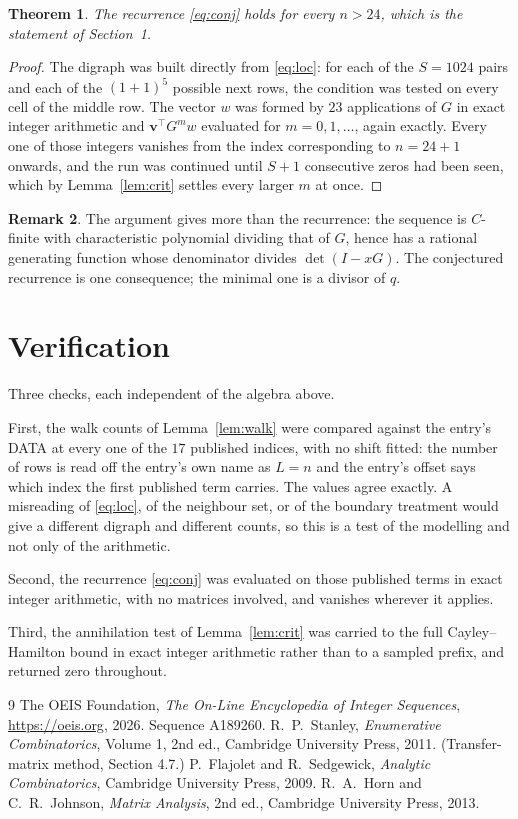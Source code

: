 \documentclass[11pt,a4paper]{article}
\theoremstyle{plain}
\newtheorem{theorem}{Theorem}
\theoremstyle{definition}
\newtheorem{remark}[theorem]{Remark}
\begin{document}
\begin{theorem}
The recurrence \eqref{eq:conj} holds for every $n>24$, which is the statement of
Section~1.
\end{theorem}

\begin{proof}
The digraph was built directly from \eqref{eq:loc}: for each of the $S=1024$ pairs and each
of the $(1+1)^{5}$ possible next rows, the condition was tested on every cell of
the middle row. The vector $w$ was formed by $23$ applications of $G$ in exact integer
arithmetic and $\mathbf{v}^{\!\top}G^{m}w$ evaluated for $m=0,1,\dots$, again exactly.
Every one of those integers vanishes from the index corresponding to $n=24+1$ onwards,
and the run was continued until $S+1$ consecutive zeros had been seen, which by
Lemma~\ref{lem:crit} settles every larger $m$ at once.
\end{proof}

\begin{remark}
The argument gives more than the recurrence: the sequence is $C$-finite with characteristic
polynomial dividing that of $G$, hence has a rational generating function whose denominator
divides $\det(I-xG)$. The conjectured recurrence is one consequence; the minimal one is a
divisor of $q$.
\end{remark}

\section{Verification}

Three checks, each independent of the algebra above.

First, the walk counts of Lemma~\ref{lem:walk} were compared against the entry's DATA at
every one of the $17$ published indices, with no shift fitted: the number of rows is
read off the entry's own name as $L=n$ and the entry's offset says which index the first
published term carries. The values agree exactly. A misreading of \eqref{eq:loc}, of the
neighbour set, or of the boundary treatment would give a different digraph and different
counts, so this is a test of the modelling and not only of the arithmetic.

Second, the recurrence \eqref{eq:conj} was evaluated on those published terms in exact
integer arithmetic, with no matrices involved, and vanishes wherever it applies.

Third, the annihilation test of Lemma~\ref{lem:crit} was carried to the full
Cayley--Hamilton bound in exact integer arithmetic rather than to a sampled prefix, and
returned zero throughout.

\begin{thebibliography}{9}
 The OEIS Foundation, \emph{The On-Line Encyclopedia of Integer
Sequences}, \url{https://oeis.org}, 2026. Sequence A189260.
 R.~P.~Stanley, \emph{Enumerative Combinatorics}, Volume 1, 2nd ed.,
Cambridge University Press, 2011. (Transfer-matrix method, Section 4.7.)
 P.~Flajolet and R.~Sedgewick, \emph{Analytic Combinatorics}, Cambridge
University Press, 2009.
 R.~A.~Horn and C.~R.~Johnson, \emph{Matrix Analysis}, 2nd ed., Cambridge
University Press, 2013.
\end{thebibliography}
\end{document}
